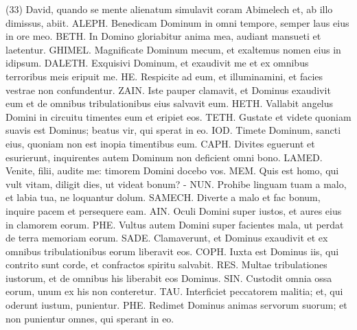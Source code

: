 \begin{biblechapter}  (33) 
\verse David, quando se mente alienatum simulavit coram Abimelech et, ab illo dimissus, abiit. 
\verse ALEPH. Benedicam Dominum in omni tempore, semper laus eius in ore meo. 
\verse BETH. In Domino gloriabitur anima mea, audiant mansueti et laetentur. 
\verse GHIMEL. Magnificate Dominum mecum, et exaltemus nomen eius in idipsum. 
\verse DALETH. Exquisivi Dominum, et exaudivit me et ex omnibus terroribus meis eripuit me. 
\verse HE. Respicite ad eum, et illuminamini, et facies vestrae non confundentur. 
\verse ZAIN. Iste pauper clamavit, et Dominus exaudivit eum et de omnibus tribulationibus eius salvavit eum. 
\verse HETH. Vallabit angelus Domini in circuitu timentes eum et eripiet eos. 
\verse TETH. Gustate et videte quoniam suavis est Dominus; beatus vir, qui sperat in eo. 
\verse IOD. Timete Dominum, sancti eius, quoniam non est inopia timentibus eum. 
\verse CAPH. Divites eguerunt et esurierunt, inquirentes autem Dominum non deficient omni bono. 
\verse LAMED. Venite, filii, audite me: timorem Domini docebo vos. 
\verse MEM. Quis est homo, qui vult vitam, diligit dies, ut videat bonum? - 
\verse NUN. Prohibe linguam tuam a malo, et labia tua, ne loquantur dolum. 
\verse SAMECH. Diverte a malo et fac bonum, inquire pacem et persequere eam. 
\verse AIN. Oculi Domini super iustos, et aures eius in clamorem eorum. 
\verse PHE. Vultus autem Domini super facientes mala, ut perdat de terra memoriam eorum. 
\verse SADE. Clamaverunt, et Dominus exaudivit et ex omnibus tribulationibus eorum liberavit eos. 
\verse COPH. Iuxta est Dominus iis, qui contrito sunt corde, et confractos spiritu salvabit. 
\verse RES. Multae tribulationes iustorum, et de omnibus his liberabit eos Dominus. 
\verse SIN. Custodit omnia ossa eorum, unum ex his non conteretur. 
\verse TAU. Interficiet peccatorem malitia; et, qui oderunt iustum, punientur. 
\verse PHE. Redimet Dominus animas servorum suorum; et non punientur omnes, qui sperant in eo. 
\end{biblechapter}

